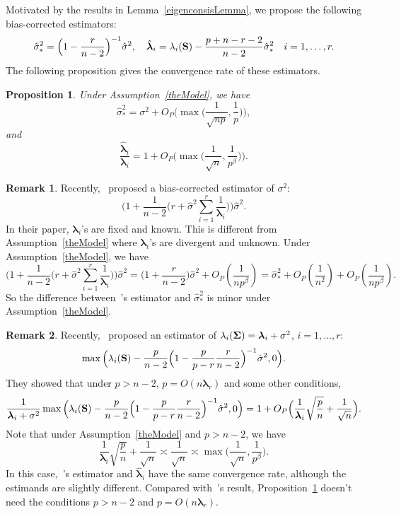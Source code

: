 \documentclass[review]{elsarticle}
\newcommand{\bfsym}[1]{\ensuremath{\boldsymbol{#1}}}
\def\blambda {\bfsym {\lambda}}        \def\bLambda {\bfsym {\Lambda}}
\theoremstyle{plain}
\newtheorem{proposition}{\quad\quad Proposition}
\theoremstyle{definition}
\newtheorem{remark}{\quad\quad Remark}
\theoremstyle{remark}
\begin{document}
Motivated by the results in Lemma~\ref{eigenconsisLemma}, we propose the following bias-corrected estimators:
$$
\hat{\sigma}_*^2= \Big(1-\frac{r}{n-2}\Big)^{-1} \hat{\sigma}^2,
\quad
\hat{\blambda}_i=\lambda_i(\BS)-\frac{p+n-r-2}{n-2}\hat{\sigma}_*^2
\quad i=1,\ldots,r.
$$
The following proposition gives the convergence rate of these estimators.
\begin{proposition}\label{varianceEstimation}
    Under Assumption~\ref{theModel}, we have %
    \begin{equation}\label{varianceEstimationPropResult1}
    \hat{\sigma}_*^2=\sigma^2 + O_P\Big(\max \big(\frac{1}{\sqrt{np}},\frac{1}{p}\big)\Big),
    \end{equation}
    and
    \begin{equation}\label{varianceEstimationPropResult2}
        \frac{\hat{\blambda}_i}{\blambda_i}
        =
        1+
        O_P\Big(\max\big(\frac{1}{\sqrt{n}},\frac{1}{p^{\beta}}\big)\Big).
    \end{equation}
\end{proposition}
\begin{remark}
Recently,~\cite{Passemier2015} proposed a bias-corrected estimator of $\sigma^2$:
$$
\Big(1+\frac{1}{n-2}\big(r+\hat{\sigma}^2\sum_{i=1}^r \frac{1}{\blambda_i}\big)\Big)\hat{\sigma}^2.
$$
In their paper, $\blambda_i$'s are fixed and known.
    This is different from Assumption~\ref{theModel} where $\blambda_i$'s are divergent and unknown.
Under Assumption~\ref{theModel}, we have
$$
\Big(1+\frac{1}{n-2}\big(r+\hat{\sigma}^2\sum_{i=1}^r \frac{1}{\blambda_i}\big)\Big)\hat{\sigma}^2
=
    \Big(1+\frac{r}{n-2}\Big)\hat{\sigma}^2+O_P(\frac{1}{np^{\beta}})
    =
    \hat{\sigma}_*^2
    +O_P(\frac{1}{n^2})+O_P(\frac{1}{np^{\beta}}).
$$
    So the difference between~\cite{Passemier2015}'s estimator and $\hat{\sigma}_*^2$ is minor under Assumption~\ref{theModel}.
\end{remark}
\begin{remark}
    Recently,~\cite{Fan2015Asymptotics} proposed an estimator of
    $\lambda_i(\bSigma)=\blambda_i+\sigma^2$, $i=1,\ldots, r$:
    $$
    \max\Big(\lambda_i(\mathbf{S})-\frac{p}{n-2}\Big(1-\frac{p}{p-r}\frac{r}{n-2}\Big)^{-1}\hat{\sigma}^2,0\Big).
    $$
    They showed that under $p>n-2$, $p=O(n\blambda_r)$ and some other conditions,
    $$
    \frac{1}{\blambda_i+\sigma^2}\max\Big(\lambda_i(\BS)-\frac{p}{n-2}\Big(1-\frac{p}{p-r}\frac{r}{n-2}\Big)^{-1}\hat{\sigma}^2,0\Big)
    =1+O_P\Big(\frac{1}{\blambda_i}\sqrt{\frac{p}{n}}+\frac{1}{\sqrt{n}}\Big).
    $$
    Note that under Assumption~\ref{theModel} and $p>n-2$, we have
    $$
\frac{1}{\blambda_i}\sqrt{\frac{p}{n}}+\frac{1}{\sqrt{n}}\asymp
\frac{1}{\sqrt{n}}
\asymp
        \max\big(\frac{1}{\sqrt{n}},\frac{1}{p^{\beta}}\big).
    $$
    In this case,~\cite{Fan2015Asymptotics}'s estimator and $\hat{\blambda}_i$ have the same convergence rate, although the estimands are slightly different.
    Compared with~\cite{Fan2015Asymptotics}'s result, Proposition~\ref{varianceEstimation} doesn't need the conditions $p>n-2$ and $p=O(n\blambda_r)$.
\end{remark}
\end{document}
